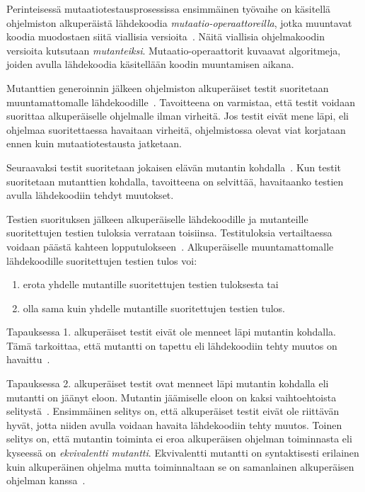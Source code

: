 \documentclass[finnish, grading]{tktltiki2}
\theoremstyle{definition}
\theoremstyle{remark}
\begin{document}
Perinteisessä mutaatiotestausprosessissa ensimmäinen työvaihe on käsitellä ohjelmiston alkuperäistä lähdekoodia \textit{mutaatio-operaattoreilla}, jotka muuntavat koodia muodostaen siitä viallisia versioita~\cite[s. 869]{Ma:Harrold:Kwon:2006}. Näitä viallisia ohjelmakoodin versioita kutsutaan \textit{mutanteiksi}. Mutaatio-operaattorit kuvaavat algoritmeja, joiden avulla lähdekoodia käsitellään koodin muuntamisen aikana.

Mutanttien generoinnin jälkeen ohjelmiston alkuperäiset testit suoritetaan muuntamattomalle lähdekoodille~\cite[s. 652]{Jia:Harman:2011}. Tavoitteena on varmistaa, että testit voidaan suorittaa alkuperäiselle ohjelmalle ilman virheitä. Jos testit eivät mene läpi, eli ohjelmaa suoritettaessa havaitaan virheitä, ohjelmistossa olevat viat korjataan ennen kuin mutaatiotestausta jatketaan. 

Seuraavaksi testit suoritetaan jokaisen elävän mutantin kohdalla~\cite[s. 35]{Offutt:Untch:2001}. Kun testit suoritetaan mutanttien kohdalla, tavoitteena on selvittää, havaitaanko testien avulla lähdekoodiin tehdyt muutokset. 

Testien suorituksen jälkeen alkuperäiselle lähdekoodille ja mutanteille suoritettujen testien tuloksia verrataan toisiinsa. Testituloksia vertailtaessa voidaan päästä kahteen lopputulokseen~\cite[s. 36]{DeMillo:Lipton:Sayward:1978}. Alkuperäiselle muuntamattomalle lähdekoodille suoritettujen testien tulos voi: 
\begin{enumerate}
  \item erota yhdelle mutantille suoritettujen testien tuloksesta tai
  \item olla sama kuin yhdelle mutantille suoritettujen testien tulos.
\end{enumerate}

Tapauksessa 1. alkuperäiset testit eivät ole menneet läpi mutantin kohdalla. Tämä tarkoittaa, että mutantti on tapettu eli lähdekoodiin tehty muutos on havaittu~\cite[s. 36]{DeMillo:Lipton:Sayward:1978}.

Tapauksessa 2. alkuperäiset testit ovat menneet läpi mutantin kohdalla eli mutantti on jäänyt eloon. Mutantin jäämiselle eloon on kaksi vaihtoehtoista selitystä~\cite[s. 36]{DeMillo:Lipton:Sayward:1978}. Ensimmäinen selitys on, että alkuperäiset testit eivät ole riittävän hyvät, jotta niiden avulla voidaan havaita lähdekoodiin tehty muutos. Toinen selitys on, että mutantin toiminta ei eroa alkuperäisen ohjelman toiminnasta eli kyseessä on \textit{ekvivalentti mutantti}. Ekvivalentti mutantti on syntaktisesti erilainen kuin alkuperäinen ohjelma mutta toiminnaltaan se on samanlainen alkuperäisen ohjelman kanssa~\cite[s. 652]{Jia:Harman:2011}.
\end{document}
